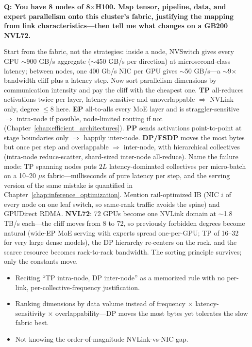 \begin{interviewq}
\textbf{Q: You have 8 nodes of 8$\times$H100. Map tensor, pipeline, data, and expert parallelism onto this cluster's fabric, justifying the mapping from link characteristics---then tell me what changes on a GB200 NVL72.}

 \quad {} \quad \badgefreq{\freqmed}

\stronganswer Start from the fabric, not the strategies: inside a node, NVSwitch gives every GPU $\sim$900 GB/s aggregate ($\sim$450 GB/s per direction) at microsecond-class latency; between nodes, one 400 Gb/s NIC per GPU gives $\sim$50 GB/s---a $\sim$9$\times$ bandwidth cliff plus a latency step. Now sort parallelism dimensions by communication intensity and pay the cliff with the cheapest one. \textbf{TP} all-reduces activations twice per layer, latency-sensitive and unoverlappable $\Rightarrow$ NVLink only, degree $\leq 8$ here. \textbf{EP} all-to-alls every MoE layer and is straggler-sensitive $\Rightarrow$ intra-node if possible, node-limited routing if not (Chapter~\ref{chap:efficient_architectures}). \textbf{PP} sends activations point-to-point at stage boundaries only $\Rightarrow$ happily inter-node. \textbf{DP/FSDP} moves the most bytes but once per step and overlappable $\Rightarrow$ inter-node, with hierarchical collectives (intra-node reduce-scatter, shard-sized inter-node all-reduce). Name the failure mode: TP spanning nodes puts $2L$ latency-dominated collectives per micro-batch on a 10--20 $\mu$s fabric---milliseconds of pure latency per step, and the serving version of the same mistake is quantified in Chapter~\ref{chap:inference_optimization}. Mention rail-optimized IB (NIC $i$ of every node on one leaf switch, so same-rank traffic avoids the spine) and GPUDirect RDMA. \textbf{NVL72}: 72 GPUs become one NVLink domain at $\sim$1.8 TB/s each---the cliff moves from 8 to 72, so previously forbidden degrees become natural (wide-EP MoE serving with experts spread one-per-GPU; TP of 16--32 for very large dense models), the DP hierarchy re-centers on the rack, and the scarce resource becomes rack-to-rack bandwidth. The sorting principle survives; only the constants move.

\redflags
\begin{itemize}
    \item Reciting ``TP intra-node, DP inter-node'' as a memorized rule with no per-link, per-collective-frequency justification.
    \item Ranking dimensions by data volume instead of frequency $\times$ latency-sensitivity $\times$ overlappability---DP moves the most bytes yet tolerates the slow fabric best.
    \item Not knowing the order-of-magnitude NVLink-vs-NIC gap.
\end{itemize}


\end{interviewq}
